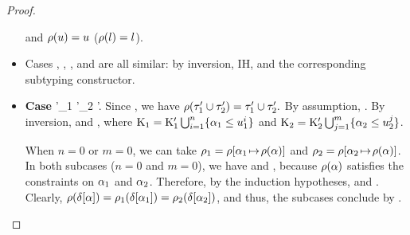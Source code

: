 \begin{proof}
\begin{itemize}
            and $\rho(u) = u$ ($\rho(l) = l$).
        \item Cases , , , and 
            are all similar: by inversion, IH, and the corresponding subtyping
            constructor.
        \item \textbf{Case } 
            {\CSet'_1 \cup \CSet'_2 \cup \CSet'}.
            Since , we have
            $\rho(\tau'_1 \cup \tau'_2) = \tau'_1 \cup \tau'_2.$
            By assumption,
            .
            By inversion, 
            and
            ,
            where $\mathrm{K}_1 = \mathrm{K}'_1 \textstyle\bigcup_{i=1}^n \{\alpha_1 \leq u_1^i\}$
            and $\mathrm{K}_2 = \mathrm{K}'_2 \textstyle\bigcup_{j=1}^m \{\alpha_2 \leq u_2^j\}$.
            
            When $n=0$ or $m=0$, we can take $\rho_1 = 
                \rho[\alpha_1\!\mapsto\!\rho(\alpha)]$
            and $\rho_2 = 
                \rho[\alpha_2\!\mapsto\!\rho(\alpha)]$.
            In both subcases ($n=0$ and $m=0$), we have 
             and
            , because $\rho(\alpha)$
            satisfies the constraints on $\alpha_1$ and $\alpha_2$.
            Therefore, by the induction hypotheses,
            and
            .
            Clearly, $\rho(\delta[\alpha]) = 
                \rho_1(\delta[\alpha_1]) = 
                \rho_2(\delta[\alpha_2])$,
            and thus, the subcases conclude by .


\end{itemize}
\end{proof}
